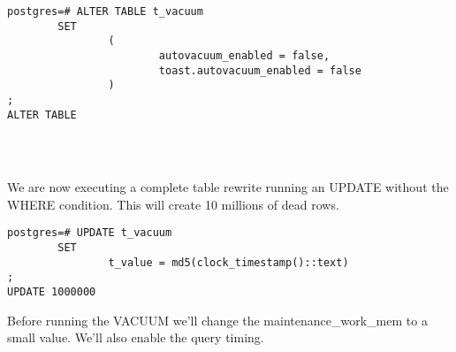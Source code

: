 \begin{lstlisting}[style=pgsql]
postgres=# ALTER TABLE t_vacuum 
        SET 
                (
                        autovacuum_enabled = false, 
                        toast.autovacuum_enabled = false
                )
;
ALTER TABLE




\end{lstlisting}

We are now executing a complete table rewrite running an UPDATE without the WHERE condition. 
This will create 10 millions of dead rows.\newline

\begin{lstlisting}[style=pgsql]
postgres=# UPDATE t_vacuum 
        SET 
                t_value = md5(clock_timestamp()::text)
;
UPDATE 1000000

\end{lstlisting}

Before running the VACUUM we'll change the maintenance\_work\_mem to a small value. We'll also enable the 
query timing.\newline

